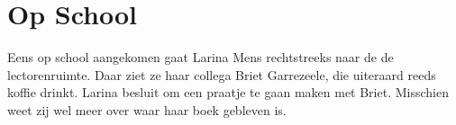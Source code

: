 \section{Op School}

Eens op school aangekomen gaat Larina Mens rechtstreeks naar de de lectorenruimte. Daar ziet ze haar collega Briet Garrezeele, die uiteraard reeds koffie drinkt. Larina besluit om een praatje te gaan maken met Briet. Misschien weet zij wel meer over waar haar boek gebleven is.
